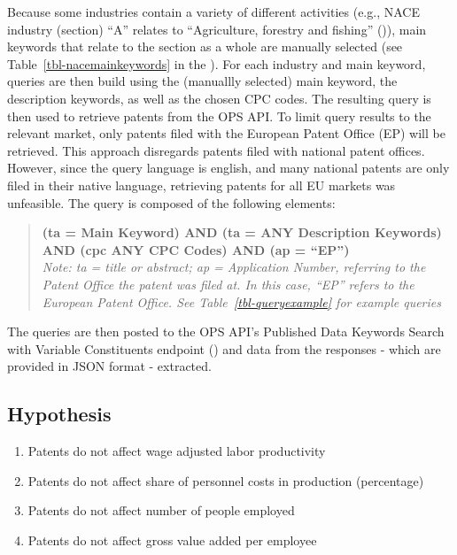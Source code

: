 \documentclass[
  11,
  a4paperpaper,
]{article}
\providecommand{\tightlist}{%
  \setlength{\itemsep}{0pt}\setlength{\parskip}{0pt}}\usepackage{longtable,booktabs,array}
\begin{document}
Because some industries contain a variety of different activities (e.g.,
NACE industry (section) ``A'' relates to ``Agriculture, forestry and
fishing'' ()),
main keywords that relate to the section as a whole are manually
selected (see Table~\ref{tbl-nacemainkeywords} in the
). For each industry and main keyword, queries are
then build using the (manuallly selected) main keyword, the description
keywords, as well as the chosen CPC codes. The resulting query is then
used to retrieve patents from the OPS API. To limit query results to the
relevant market, only patents filed with the European Patent Office (EP)
will be retrieved. This approach disregards patents filed with national
patent offices. However, since the query language is english, and many
national patents are only filed in their native language, retrieving
patents for all EU markets was unfeasible. The query is composed of the
following elements:

\begin{quote}
\textbf{(ta = Main Keyword) AND (ta = ANY Description Keywords) AND (cpc
ANY CPC Codes) AND (ap = ``EP'')}\\
\emph{Note: ta = title or abstract; ap = Application Number, referring
to the Patent Office the patent was filed at. In this case, ``EP''
refers to the European Patent Office. See Table~\ref{tbl-queryexample}
for example queries}
\end{quote}

The queries are then posted to the OPS API's Published Data Keywords
Search with Variable Constituents endpoint
() and data from the responses - which are provided in JSON
format - extracted.

\subsection{Hypothesis}\label{hypothesis}

\begin{enumerate}
\def\labelenumi{\arabic{enumi}.}
\tightlist
\item
  Patents do not affect wage adjusted labor productivity
\item
  Patents do not affect share of personnel costs in production
  (percentage)
\item
  Patents do not affect number of people employed
\item
  Patents do not affect gross value added per employee
\end{enumerate}
\end{document}
